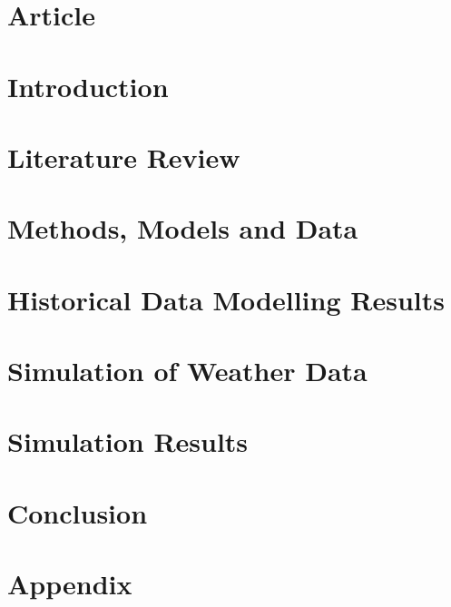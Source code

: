 \documentclass[hidelinks,12pt]{report}
\begin{document}
\frontmatter
{}









\tableofcontents



\pagebreak
\listoffigures
\pagebreak
\listoftables

 
\mainmatter

\chapter{Article}


\chapter{Introduction}


\chapter{Literature Review}


\chapter{Methods, Models and Data}


\chapter{Historical Data Modelling Results}


\chapter{Simulation of Weather Data}


\chapter{Simulation Results}



\chapter{Conclusion}





\chapter{Appendix}

\end{document}
